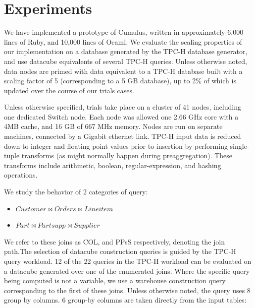 
\section{Experiments}
\label{sec:experiments}

We have implemented a prototype of Cumulus, written in approximately 6,000 lines of Ruby, and 10,000 lines of Ocaml.  We evaluate the scaling properties of our implementation on a database generated by the TPC-H database generator, and use datacube equivalents of several TPC-H queries.  Unless otherwise noted, data nodes are primed with data equivalent to a TPC-H database built with a scaling factor of 5 (corresponding to a 5 GB database), up to 2\% of which is updated over the course of our trials cases.

Unless otherwise specified, trials take place on a cluster of 41 nodes, including one dedicated Switch node.  Each node was allowed one 2.66 GHz core with a 4MB cache, and 16 GB of 667 MHz memory.  Nodes are run on separate machines, connected by a Gigabit ethernet link.  TPC-H input data is reduced down to integer and floating point values prior to insertion by performing single-tuple transforms (as might normally happen during preaggregation).  These transforms include arithmetic, boolean, regular-expression, and hashing operations.

We study the behavior of 2 categories of query: 
\begin{itemize}
\item $Customer \bowtie Orders \bowtie Lineitem$
\item $Part \bowtie Partsupp \bowtie Supplier$
\end{itemize}
We refer to these joins as COL, and PPsS respectively, denoting the join path.The selection of datacube construction queries is guided by the TPC-H query workload.  12 of the 22 queries in the TPC-H workload can be evaluated on a datacube generated over one of the enumerated joins.  Where the specific query being computed is not a variable, we use a warehouse construction query corresponding to the first of these joins.  Unless otherwise noted, the query uses 8 group by columns.  6 group-by columns are taken directly from the input tables: 

